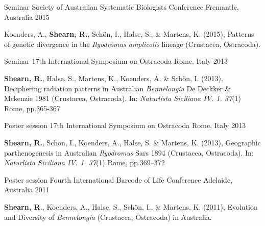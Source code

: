
\begin{cventries}

	\cventry
	{Seminar} %
	{Society of Australian Systematic Biologists Conference} %
	{Fremantle, Australia} %
	{2015} %
	{
		\begin{cvitems} %
			\item {Koenders, A., \textbf{Shearn, R.}, Schön, I., Halse, S., \& Martens, K. (2015), Patterns of genetic divergence in the \textit{Ilyodromus amplicolis} lineage (Crustacea, Ostracoda).}
		\end{cvitems}
	}

	\cventry
	{Seminar} %
	{17th International Symposium on Ostracoda} %
	{Rome, Italy} %
	{2013} %
	{
		\begin{cvitems} %
			\item {\textbf{Shearn, R.}, Halse, S., Martens, K., Koenders, A. \& Schön, I. (2013), Deciphering radiation patterns in Australian \textit{Bennelongia} De Deckker \& Mckenzie 1981 (Crustacea, Ostracoda). In: \emph{Naturlista Siciliana IV. 1. 37}(1) Rome, pp.365-367}
		\end{cvitems}
	}

	\cventry
	{Poster session} %
	{17th International Symposium on Ostracoda} %
	{Rome, Italy} %
	{2013} %
	{
		\begin{cvitems} %
			\item {\textbf{Shearn, R.}, Schön, I., Koenders, A., Halse, S. \& Martens, K. (2013), Geographic parthenogenesis in Australian \textit{Ilyodromus} Sars 1894 (Crustacea, Ostracoda). In: \emph{Naturlista Siciliana IV. 1. 37}(1) Rome, pp.369–372}
		\end{cvitems}
	}

	\cventry
	{Poster session} %
	{Fourth International Barcode of Life Conference} %
	{Adelaide, Australia} %
	{2011} %
	{
		\begin{cvitems} %
			\item {\textbf{Shearn, R.}, Koenders, A., Halse, S., Schön, I., \& Martens, K. (2011), Evolution and Diversity of \textit{Bennelongia} (Crustacea, Ostracoda) in Australia.}
		\end{cvitems}
	}
	

\end{cventries}
